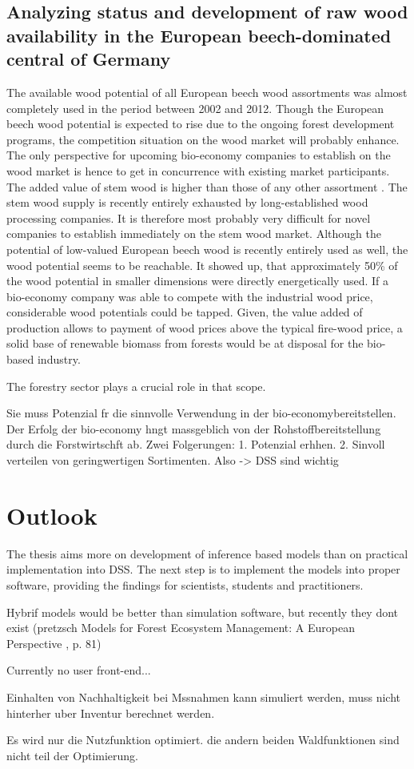 \subsection{Analyzing status and development of raw wood availability in the European beech-dominated central of Germany}
\label{subsec:discussion:dindings:hzb}
The available wood potential of all European beech wood assortments was almost completely used in the period between 2002 and 2012. Though the European beech wood potential is expected to rise due to the ongoing forest development programs, the competition situation on the wood market will probably enhance. The only perspective for upcoming bio-economy companies to establish on the wood market is hence to get in concurrence with existing market participants. The added value of stem wood is higher than those of any other assortment \citep{nagel_2008}. The stem wood supply is recently entirely exhausted by long-established wood processing companies. It is therefore most probably very difficult for novel companies to establish immediately on the stem wood market. Although the potential of low-valued European beech wood is recently entirely used as well, the wood potential seems to be reachable. It showed up, that approximately 50\% of the wood potential in smaller dimensions were directly energetically used. If a bio-economy company was able to compete with the industrial wood price, considerable wood potentials could be tapped. Given, the value added of production allows to payment of wood prices above the typical fire-wood price, a solid base of renewable biomass from forests would be at disposal for the bio-based industry.

The forestry sector plays a crucial role in that scope.

Sie muss Potenzial fr die sinnvolle Verwendung in der bio-economybereitstellen. Der Erfolg der bio-economy hngt massgeblich von der Rohstoffbereitstellung durch die Forstwirtschft ab. Zwei Folgerungen: 1. Potenzial erhhen. 2. Sinvoll verteilen von geringwertigen Sortimenten.
Also -> DSS sind wichtig

\section{Outlook}
\label{sec:discussion:outlook}
The thesis aims more on development of inference based models than on practical implementation into DSS. The next step is to implement the models into proper software, providing the findings for scientists, students and practitioners.

Hybrif models would be better than simulation software, but recently they dont exist (pretzsch Models for Forest Ecosystem Management: A European Perspective
, p. 81)

Currently no user front-end...

Einhalten von Nachhaltigkeit bei Mssnahmen kann simuliert werden, muss nicht hinterher uber Inventur berechnet werden.

Es wird nur die Nutzfunktion optimiert. die andern beiden Waldfunktionen sind nicht teil der Optimierung.

